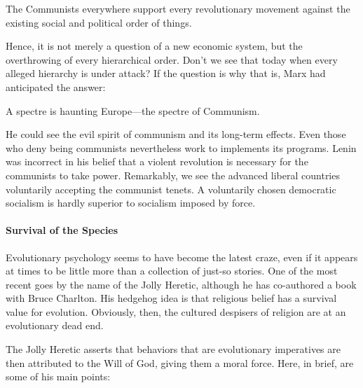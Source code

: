 \begin{quotex}
The Communists everywhere support every revolutionary movement against the existing social and political order of things. 

\end{quotex}
Hence, it is not merely a question of a new economic system, but the overthrowing of every hierarchical order. Don't we see that today when every alleged hierarchy is under attack? If the question is why that is, Marx had anticipated the answer:

\begin{quotex}
A spectre is haunting Europe—the spectre of Communism. 

\end{quotex}
He could see the evil spirit of communism and its long-term effects. Even those who deny being communists nevertheless work to implements its programs. Lenin was incorrect in his belief that a violent revolution is necessary for the communists to take power. Remarkably, we see the advanced liberal countries voluntarily accepting the communist tenets. A voluntarily chosen democratic socialism is hardly superior to socialism imposed by force.

\paragraph{Survival of the Species}
Evolutionary psychology seems to have become the latest craze, even if it appears at times to be little more than a collection of just-so stories. One of the most recent goes by the name of the Jolly Heretic, although he has co-authored a book with Bruce Charlton. His hedgehog idea is that religious belief has a survival value for evolution. Obviously, then, the cultured despisers of religion are at an evolutionary dead end.

The Jolly Heretic asserts that behaviors that are evolutionary imperatives are then attributed to the Will of God, giving them a moral force. Here, in brief, are some of his main points:

